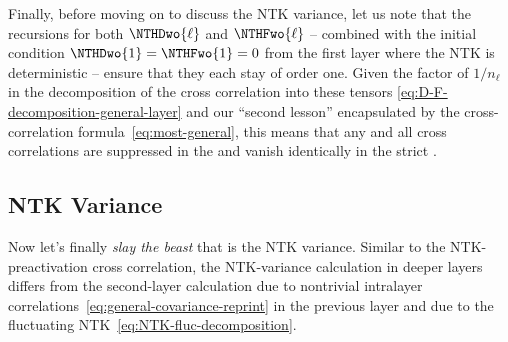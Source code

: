 Finally, before moving on to discuss the NTK variance, let us note that the recursions for both $\NTHDwo{\ell}$ and $\NTHFwo{\ell}$ -- combined with
the initial condition $\NTHDwo{1}=\NTHFwo{1}=0$ from the first layer where the NTK is deterministic -- ensure that they each stay of order one. Given the factor of $1/n_\ell$ in the decomposition of the cross correlation into these tensors \eqref{eq:D-F-decomposition-general-layer} and our ``second lesson'' encapsulated by the cross-correlation formula~\eqref{eq:most-general}, this means that any and all cross correlations are suppressed in the  and vanish identically in the strict .




\subsection{NTK Variance}\label{subsec:NTHvariance}
Now let's finally \emph{slay the beast} that is the NTK variance.
Similar to the NTK-preactivation cross correlation, the NTK-variance calculation in deeper layers differs from the second-layer calculation due to nontrivial intralayer correlations~\eqref{eq:general-covariance-reprint} in the previous layer
and due to the fluctuating NTK~\eqref{eq:NTK-fluc-decomposition}.

